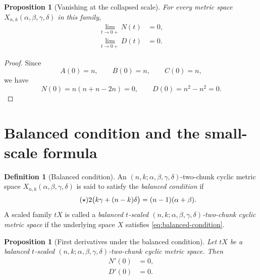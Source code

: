 \documentclass[11pt]{amsart}
\numberwithin{equation}{section}
\newtheorem{proposition}[theorem]{Proposition}
\theoremstyle{definition}
\newtheorem{definition}[theorem]{Definition}
\theoremstyle{remark}
\begin{document}
\begin{proposition}[Vanishing at the collapsed scale]\label{prop:N-D-vanish}
For every metric space \(X_{n,k}(\alpha,\beta,\gamma,\delta)\) in this family,
\begin{align}
\lim_{t\to 0+}N(t)&=0,
\label{eq:N-zero-limit}\\
\lim_{t\to 0+}D(t)&=0.
\label{eq:D-zero-limit}
\end{align}
\end{proposition}

\begin{proof}
Since
\begin{equation}\label{eq:A-B-C-at-zero}
A(0)=n,
\qquad
B(0)=n,
\qquad
C(0)=n,
\end{equation}
we have
\begin{equation}\label{eq:N-D-at-zero}
N(0)=n(n+n-2n)=0,
\qquad
D(0)=n^2-n^2=0.
\end{equation}
\end{proof}

\section{Balanced condition and the small-scale formula}

\begin{definition}[Balanced condition]\label{def:balanced-condition}
An \((n,k;\alpha,\beta,\gamma,\delta)\)-two-chunk cyclic metric space \(X_{n,k}(\alpha,\beta,\gamma,\delta)\) is said to satisfy the \emph{balanced condition} if
\begin{equation}\tag{\ensuremath{\star}}\label{eq:balanced-condition}
2\bigl(k\gamma+(n-k)\delta\bigr)=(n-1)(\alpha+\beta).
\end{equation}
A scaled family \(tX\) is called a \emph{balanced \(t\)-scaled \((n,k;\alpha,\beta,\gamma,\delta)\)-two-chunk cyclic metric space} if the underlying space \(X\) satisfies \eqref{eq:balanced-condition}.
\end{definition}

\begin{proposition}[First derivatives under the balanced condition]\label{prop:first-derivatives-balanced}
Let \(tX\) be a balanced \(t\)-scaled \((n,k;\alpha,\beta,\gamma,\delta)\)-two-chunk cyclic metric space.  Then
\begin{align}
N'(0)&=0,
\label{eq:N-prime-zero}\\
D'(0)&=0.
\label{eq:D-prime-zero}
\end{align}
\end{proposition}
\end{document}
